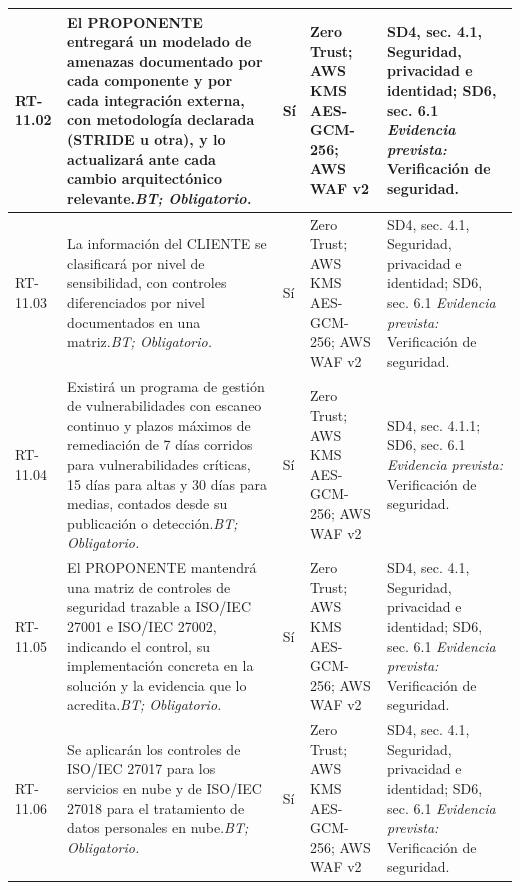 \begin{paginaHorizontalSynaptix}
\begin{longtable}{|L{0.09\AnchoMatrizTDoce}|L{0.385\AnchoMatrizTDoce}|L{0.065\AnchoMatrizTDoce}|L{0.18\AnchoMatrizTDoce}|L{0.28\AnchoMatrizTDoce}|}
RT-\allowbreak{}11.\allowbreak{}02 &
El PROPONENTE entregará un modelado de amenazas documentado por cada componente y por cada integración externa, con metodología declarada (STRIDE u otra), y lo actualizará ante cada cambio arquitectónico relevante.\newline\textit{BT; Obligatorio.} &
Sí &
Zero Trust; AWS KMS AES-GCM-256; AWS WAF v2 &
SD4, sec. 4.1, Seguridad, privacidad e identidad; SD6, sec. 6.1 \newline\textit{Evidencia prevista:} Verificación de seguridad. \\ \hline

RT-\allowbreak{}11.\allowbreak{}03 &
La información del CLIENTE se clasificará por nivel de sensibilidad, con controles diferenciados por nivel documentados en una matriz.\newline\textit{BT; Obligatorio.} &
Sí &
Zero Trust; AWS KMS AES-GCM-256; AWS WAF v2 &
SD4, sec. 4.1, Seguridad, privacidad e identidad; SD6, sec. 6.1 \newline\textit{Evidencia prevista:} Verificación de seguridad. \\ \hline

RT-\allowbreak{}11.\allowbreak{}04 &
Existirá un programa de gestión de vulnerabilidades con escaneo continuo y plazos máximos de remediación de 7 días corridos para vulnerabilidades críticas, 15 días para altas y 30 días para medias, contados desde su publicación o detección.\newline\textit{BT; Obligatorio.} &
Sí &
Zero Trust; AWS KMS AES-GCM-256; AWS WAF v2 &
SD4, sec. 4.1.1; SD6, sec. 6.1 \newline\textit{Evidencia prevista:} Verificación de seguridad. \\ \hline

RT-\allowbreak{}11.\allowbreak{}05 &
El PROPONENTE mantendrá una matriz de controles de seguridad trazable a ISO/IEC 27001 e ISO/IEC 27002, indicando el control, su implementación concreta en la solución y la evidencia que lo acredita.\newline\textit{BT; Obligatorio.} &
Sí &
Zero Trust; AWS KMS AES-GCM-256; AWS WAF v2 &
SD4, sec. 4.1, Seguridad, privacidad e identidad; SD6, sec. 6.1 \newline\textit{Evidencia prevista:} Verificación de seguridad. \\ \hline

RT-\allowbreak{}11.\allowbreak{}06 &
Se aplicarán los controles de ISO/IEC 27017 para los servicios en nube y de ISO/IEC 27018 para el tratamiento de datos personales en nube.\newline\textit{BT; Obligatorio.} &
Sí &
Zero Trust; AWS KMS AES-GCM-256; AWS WAF v2 &
SD4, sec. 4.1, Seguridad, privacidad e identidad; SD6, sec. 6.1 \newline\textit{Evidencia prevista:} Verificación de seguridad. \\ \hline


\end{longtable}
\end{paginaHorizontalSynaptix}
